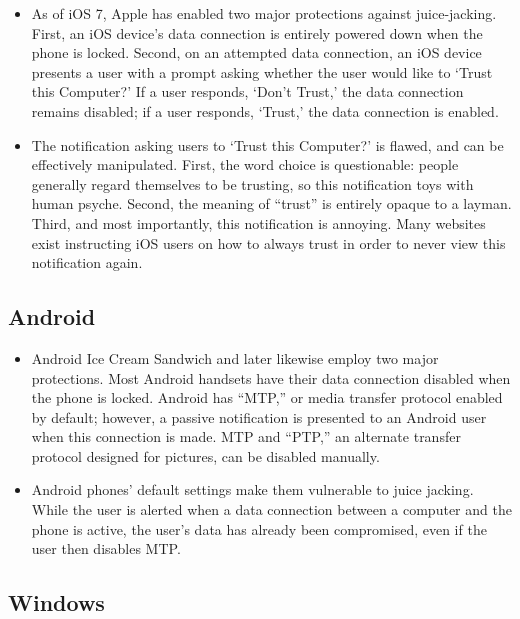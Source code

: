 \documentclass[11pt]{article} %
\begin{document}
\begin{itemize}
\item As of iOS 7, Apple has enabled two major protections against juice-jacking. First, an iOS device's data connection is entirely powered down when the phone is locked. Second, on an attempted data connection, an iOS device presents a user with a prompt asking whether the user would like to `Trust this Computer?' If a user responds, `Don't Trust,' the data connection remains disabled; if a user responds, `Trust,' the data connection is enabled. 

\item The notification asking users to `Trust this Computer?' is flawed, and can be effectively manipulated. First, the word choice is questionable: people generally regard themselves to be trusting, so this notification toys with human psyche. Second, the meaning of ``trust'' is entirely opaque to a layman. Third, and most importantly, this notification is annoying. Many websites exist instructing iOS users on how to always trust in order to never view this notification again. 
\end{itemize} 

\subsection{Android} 

\begin{itemize}
\item Android Ice Cream Sandwich and later likewise employ two major protections. Most Android handsets have their data connection disabled when the phone is locked. Android has ``MTP,'' or media transfer protocol enabled by default; however, a passive notification is presented to an Android user when this connection is made. MTP and ``PTP,'' an alternate transfer protocol designed for pictures, can be disabled manually. 

\item Android phones' default settings make them vulnerable to juice jacking. While the user is alerted when a data connection between a computer and the phone is active, the user's data has already been compromised, even if the user then disables MTP. 
\end{itemize} 

\subsection{Windows} 
\end{document}
